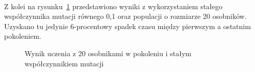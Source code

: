 \paragraph{}
Z kolei na rysunku~\ref{fig:evoC} przedstawiono wyniki z wykorzystaniem stałego współczynnika mutacji równego 0,1 oraz populacji o rozmiarze 20 osobników. Uzyskano tu jedynie 6-procentowy spadek czasu między pierwszym a ostatnim pokoleniem.
\evoC
\begin{figure}[h]
	\centering
	\caption{Wynik uczenia z 20 osobnikami w pokoleniu i stałym współczynnikiem mutacji}
	\label{fig:evoC}
\end{figure}